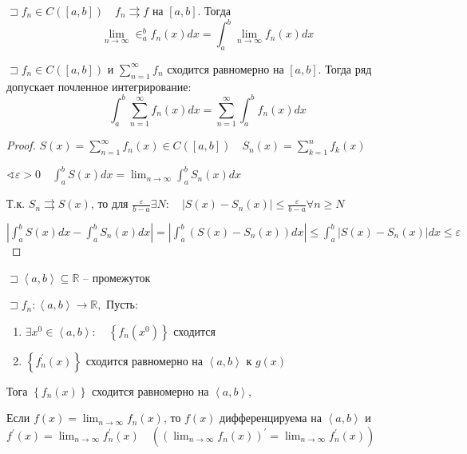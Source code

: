 \documentclass{book}
\newcommand\R{\ensuremath{\mathbb{R}}}
\newcommand{\p}[1]{#1^{\prime}}
\theoremstyle{definition}
\begin{document}
    \begin{theorem}

        $\sqsupset f_n\in C\left( \left[ a,b \right]  \right) \quad f_n \rightrightarrows f $ на $\left[ a,b \right] $. Тогда \[\lim_{n \to \infty}\in_a^bf_n(x)dx = \int_a^b \lim_{n \to \infty}  f_n(x)dx  \]
    \end{theorem}
    \begin{theorem}

        $\sqsupset f_n\in C\left( \left[ a,b \right]  \right) $ и $\sum_{n=1}^{\infty } f_n$ сходится равномерно на $\left[ a,b \right] $. Тогда ряд допускает почленное интегрирование: \[\int_a^b \sum_{n=1}^{\infty } f_n(x)dx = \sum_{n=1}^{\infty } \int_a^bf_n(x)dx\]
    \end{theorem}
    \begin{proof}
        $S(x) = \sum_{n=1}^{\infty } f_n(x)\in C\left( \left[ a,b \right]  \right) \quad S_n(x) = \sum_{k=1}^{n} f_k\left( x \right) $ 

        $\sphericalangle \varepsilon>0\quad \int_a^b S(x)dx = \lim_{n \to \infty} \int_a^b S_n(x)dx$

        Т.к. $S_n \rightrightarrows S(x)$, то для  $\frac{\varepsilon}{b-a} \exists N: \quad \left| S(x) - S_n(x) \right| \leqslant \frac{\varepsilon}{b-a} \forall n\geqslant N$

        $\left| \int_a^b S(x)dx - \int_a^bS_n(x)dx \right|  = \left| \int_a^b\left( S(x) - S_n(x) \right) dx \right| \leqslant \int_a^b \left| S(x) - S_n(x) \right| dx\leqslant \varepsilon$
    \end{proof}

    \begin{theorem}
        $\sqsupset \left<a, b \right>\subseteq \R$ -- промежуток

        $\sqsupset f_n: \left<a,b \right>\to \R, $ Пусть:
        \begin{enumerate}
            \item $\exists x^0\in \left<a, b \right>:\quad \left\{ f_n(x^0) \right\} $ сходится
            \item $\left\{ \p f_n(x) \right\} $ сходится равномерно на $\left<a,b \right>$ к $g(x)$
        \end{enumerate}

        Тога $\left\{ f_n(x) \right\} $ сходится равномерно на $\left<a,b \right>$, 

        Если $f(x) = \lim_{n \to \infty} f_n(x)$, то $f(x)$ дифференцируема на  $\left<a,b \right>$ и $\p f(x) = \lim_{n \to \infty} \p f_n(x)\quad \left(  \p {\left( \lim_{n \to \infty}  f_n(x)\right) } = \lim_{n \to \infty}  \p f_n(x)\right) $
    \end{theorem}
\end{document}
